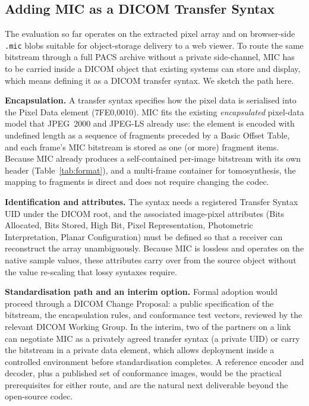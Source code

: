 \documentclass[journal]{IEEEtran}
\begin{document}
\subsection{Adding MIC as a DICOM Transfer Syntax}

The evaluation so far operates on the extracted pixel array and on browser-side
\texttt{.mic} blobs suitable for object-storage delivery to a web viewer. To
route the same bitstream through a full PACS archive without a private
side-channel, MIC has to be carried inside a DICOM object that existing systems
can store and display, which means defining it as a DICOM transfer syntax. We
sketch the path here.

\textbf{Encapsulation.} A transfer syntax specifies how the pixel data is
serialised into the Pixel Data element (7FE0,0010). MIC fits the existing
\emph{encapsulated} pixel-data model that JPEG~2000 and JPEG-LS already use:
the element is encoded with undefined length as a sequence of fragments
preceded by a Basic Offset Table, and each frame's MIC bitstream is stored as
one (or more) fragment items. Because MIC already produces a self-contained
per-image bitstream with its own header (Table~\ref{tab:format}), and a
multi-frame container for tomosynthesis, the mapping to fragments is direct and
does not require changing the codec.

\textbf{Identification and attributes.} The syntax needs a registered Transfer
Syntax UID under the DICOM root, and the associated image-pixel attributes
(Bits Allocated, Bits Stored, High Bit, Pixel Representation, Photometric
Interpretation, Planar Configuration) must be defined so that a receiver can
reconstruct the array unambiguously. Because MIC is lossless and operates on
the native sample values, these attributes carry over from the source object
without the value re-scaling that lossy syntaxes require.

\textbf{Standardisation path and an interim option.} Formal adoption would
proceed through a DICOM Change Proposal: a public specification of the
bitstream, the encapsulation rules, and conformance test vectors, reviewed by
the relevant DICOM Working Group. In the interim, two of the partners on a link
can negotiate MIC as a privately agreed transfer syntax (a private UID) or carry
the bitstream in a private data element, which allows deployment inside a
controlled environment before standardisation completes. A reference encoder and
decoder, plus a published set of conformance images, would be the practical
prerequisites for either route, and are the natural next deliverable beyond the
open-source codec.
\end{document}
